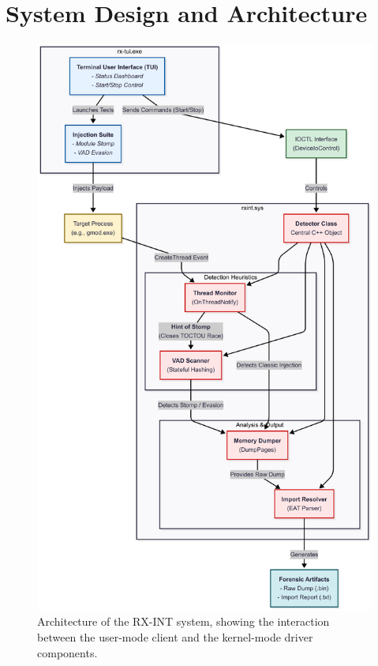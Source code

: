 \documentclass[journal]{IEEEtran}
\begin{document}
\section{System Design and Architecture}\label{sec:design}
\begin{figure}[!t]
\centering
\includegraphics[width=0.9\columnwidth]{figures/architecture.png}
\caption{Architecture of the RX-INT system, showing the interaction between the user-mode client and the kernel-mode driver components.}
\label{fig_architecture}
\end{figure}
\end{document}
